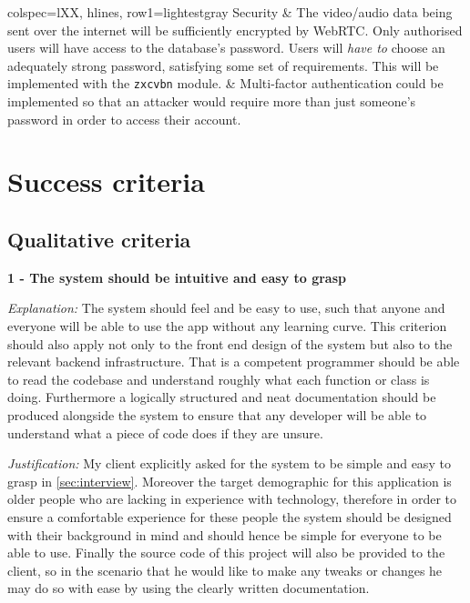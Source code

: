 \begin{longtblr}[
  caption={Summary of requirements.}
]{
  colspec={lXX}, hlines, row{1}={lightestgray}
}
Security & {The video/audio data being sent over the internet will 
            be sufficiently encrypted by WebRTC. Only authorised users
            will have access to the database's password. Users will 
	    \emph{have to} choose an adequately strong password, 
            satisfying some set of requirements. This will be 
            implemented with the \texttt{zxcvbn} module.} & 
	    {Multi-factor authentication could be implemented so that
	     an attacker would require more than just someone's 
             password in order to access their account.}\\

\end{longtblr}

\section{Success criteria}

\subsection{Qualitative criteria}

\textsf{\bfseries 1 - The system should be intuitive and easy to grasp}
\vspace{0.1cm}

\textit{Explanation:}
The system should feel and be easy to use, such that anyone
and everyone will be able to use the app without any learning
curve. This criterion should also apply not only to the front
end design of the system but also to the relevant backend 
infrastructure. That is a competent programmer should be able to 
read the codebase and understand roughly what each function or 
class is doing. Furthermore a logically structured and neat 
documentation should be produced alongside the system to 
ensure that any developer will be able to understand what 
a piece of code does if they are unsure.

\vspace{0.1cm}

\textit{Justification:} 
My client explicitly asked for the system to be simple and 
easy to grasp in \ref{sec:interview}. Moreover the target 
demographic for this application is older people who are 
lacking in experience with technology, therefore in order to 
ensure a comfortable experience for these people the system 
should be designed with their background in mind and should
hence be simple for everyone to be able to use. Finally the 
source code of this project will also be provided to the 
client, so in the scenario that he would like to make any 
tweaks or changes he may do so with ease by using the clearly 
written documentation.

